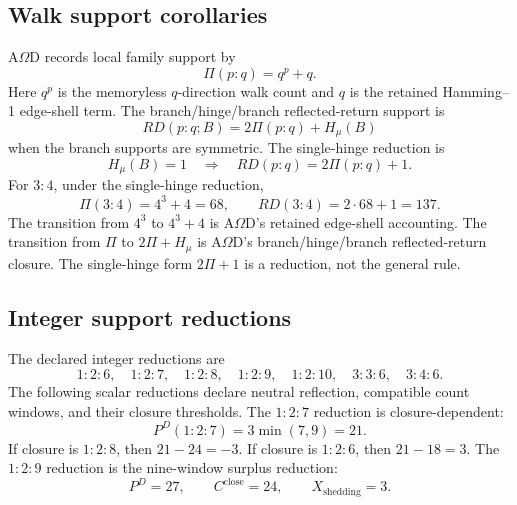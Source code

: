 \subsection{Walk support corollaries}
\label{app:rd-tests:corollaries}
A\(\Omega\)D records local family support by
\begin{equation}
\Pi(p{:}q)=q^p+q.
\label{app:rd:eq:path-support}
\end{equation}
Here \(q^p\) is the memoryless \(q\)-direction walk count and \(q\) is the retained Hamming--1 edge-shell term. The branch/hinge/branch reflected-return support is
\begin{equation}
RD(p{:}q;B)=2\Pi(p{:}q)+H_\mu(B)
\label{app:rd:eq:reflected-return}
\end{equation}
when the branch supports are symmetric. The single-hinge reduction is
\begin{equation}
H_\mu(B)=1
\quad\Longrightarrow\quad
RD(p{:}q)=2\Pi(p{:}q)+1.
\label{app:rd:eq:single-hinge-return}
\end{equation}
For \(3{:}4\), under the single-hinge reduction,
\begin{equation}
\Pi(3{:}4)=4^3+4=68,
\qquad
RD(3{:}4)=2\cdot68+1=137.
\label{app:rd:eq:three-four-rd}
\end{equation}
The transition from \(4^3\) to \(4^3+4\) is A\(\Omega\)D's retained edge-shell accounting. The transition from \(\Pi\) to \(2\Pi+H_\mu\) is A\(\Omega\)D's branch/hinge/branch reflected-return closure. The single-hinge form \(2\Pi+1\) is a reduction, not the general rule.

\subsection{Integer support reductions}
\label{app:rd-tests:support-reductions}
The declared integer reductions are
\[
1{:}2{:}6,
\quad
1{:}2{:}7,
\quad
1{:}2{:}8,
\quad
1{:}2{:}9,
\quad
1{:}2{:}10,
\quad
3{:}3{:}6,
\quad
3{:}4{:}6.
\]
The following scalar reductions declare neutral reflection, compatible count windows, and their closure thresholds. The \(1{:}2{:}7\) reduction is closure-dependent:
\[
P^D(1{:}2{:}7)=3\min(7,9)=21.
\]
If closure is \(1{:}2{:}8\), then \(21-24=-3\). If closure is \(1{:}2{:}6\), then \(21-18=3\).
The \(1{:}2{:}9\) reduction is the nine-window surplus reduction:
\[
P^D=27,
\qquad
C^{\mathrm{close}}=24,
\qquad
X_{\mathrm{shedding}}=3.
\]



